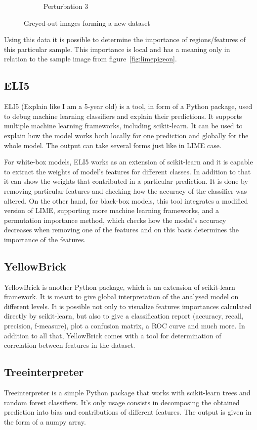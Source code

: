 \begin{figure}[H]
\begin{subfigure}[t]{0.32\linewidth}
        \caption{Perturbation 3}
    \end{subfigure}
    \caption{Greyed-out images forming a new dataset}
    \label{fig:limegrey}
\end{figure}

Using this data it is possible to determine the importance of regions/features of this particular sample. This importance is local and has a meaning only in relation to the sample image from figure~\ref{fig:limepigeon}. 

\subsection{ELI5}
ELI5 (Explain like I am a 5-year old) is a tool, in form of a Python package, used to debug machine learning classifiers and explain their predictions. It supports multiple machine learning frameworks, including scikit-learn. It can be used to explain how the model works both locally for one prediction and globally for the whole model. The output can take several forms just like in LIME case.

For white-box models, ELI5 works as an extension of scikit-learn and it is capable to extract the weights of model's features for different classes. In addition to that it can show the weights that contributed in a particular prediction. It is done by removing particular features and checking how the accuracy of the classifier was altered. On the other hand, for black-box models, this tool integrates a modified version of LIME, supporting more machine learning frameworks, and a permutation importance method, which checks how the model's accuracy decreases when removing one of the features and on this basis determines the importance of the features.

\subsection{YellowBrick}
YellowBrick is another Python package, which is an extension of scikit-learn framework. It is meant to give global interpretation of the analysed model on different levels. It is possible not only to visualize features importances calculated directly by scikit-learn, but also to give a classification report (accuracy, recall, precision, f-measure), plot a confusion matrix, a ROC curve and much more. In addition to all that, YellowBrick comes with a tool for determination of correlation between features in the dataset.

\subsection{Treeinterpreter}
Treeinterpreter is a simple Python package that works with scikit-learn trees and random forest classifiers. It's only usage consists in decomposing the obtained prediction into bias and contributions of different features. The output is given in the form of a numpy array.

